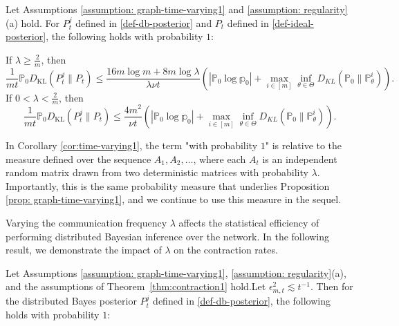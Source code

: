 \documentclass[twoside,11pt]{article}
\numberwithin{equation}{section}
\newcommand\bP{\mathbb{P}}
\newcommand\bp{\mathbb{p}}
\begin{document}
{ 
\begin{corollary}
\label{cor:time-varying1}
    Let Assumptions \ref{assumption: graph-time-varying1} and \ref{assumption: regularity}(a) hold. For $P_t^j$ defined in \eqref{def-db-posterior} and $P_t$ defined in \eqref{def-ideal-posterior}, the following holds with probability $1$: 
    
    If $\lambda \geq \frac{2}{m}$, then
    \begin{equation*}
\frac{1}{mt} \bP_0 D_{\text{KL}}(P_t^j \parallel P_t) \leq  \frac{16 m \log m + 8m \log \lambda}{\lambda \nu t} \left(|\bP_0\log \bp_0| +  \max_{i \in [m]}\inf_{\theta \in \Theta} D_{KL}(\bP_0 \parallel \bP_\theta^i) \right). 
    \end{equation*}
If $0<\lambda < \frac{2}{m}$, then
    \begin{equation*}
\frac{1}{mt} \bP_0 D_{\text{KL}}(P_t^j \parallel P_t) \leq  \frac{4m^2}{\nu t}\left(|\bP_0\log \bp_0| +  \max_{i \in [m]}\inf_{\theta \in \Theta} D_{KL}(\bP_0 \parallel \bP_\theta^i) \right). 
    \end{equation*}
\end{corollary}

In Corollary \ref{cor:time-varying1}, the term "with probability \(1\)" is relative to the measure defined over the sequence \(A_1, A_2, \ldots\), where each \(A_t\) is an independent random matrix drawn from two deterministic matrices with probability \(\lambda\). Importantly, this is the same probability measure that underlies Proposition \ref{prop: graph-time-varying1}, and we continue to use this measure in the sequel.

Varying the communication frequency $\lambda$ affects the statistical efficiency of performing distributed Bayesian inference over the network. In the following result, we demonstrate the impact of $\lambda$ on the contraction rates. 
\begin{corollary}\label{cor:time-varying2}
Let Assumptions \ref{assumption: graph-time-varying1},  \ref{assumption: regularity}(a), and the assumptions of Theorem~\ref{thm:contraction1} hold.Let $\epsilon_{m,t}^2 \lesssim t^{-1}$. Then for the distributed Bayes posterior $P_t^j$ defined in \eqref{def-db-posterior}, the following holds with probability $1$:


\end{corollary}}
\end{document}
